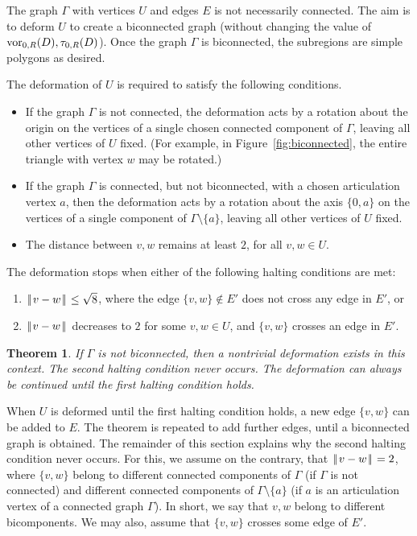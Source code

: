 \documentclass[11pt]{amsart}
\def\op#1{{\text{#1}}}
\def\text{\hbox}
\def\|{{\hskip0.1em|\hskip-0.15em|\hskip0.1em}}
\newtheorem{thm}{Theorem}
\begin{document}
The graph $\Gamma$ with vertices $U$ and edges $E$ is not necessarily connected.  The aim is to deform
$U$ to create a biconnected graph (without changing the value of $\op{vor}_{0,R}(D),\tau_{0,R}(D)$).  Once the graph $\Gamma$
is biconnected, the subregions are simple polygons as desired.

The deformation of $U$ is required to satisfy the following conditions.
\begin{itemize}
\item If the graph $\Gamma$ is not connected,
the deformation acts by a rotation about the origin 
on the vertices of a single chosen connected component of $\Gamma$,
leaving all other vertices of $U$ fixed.  (For example, in Figure~\ref{fig:biconnected}, the entire triangle with vertex $w$ may be rotated.)
\item If the graph $\Gamma$ is connected, but not biconnected, with a chosen articulation vertex $a$, then
the deformation acts by a rotation about the axis $\{0,a\}$ on the vertices of a single component of $\Gamma\setminus\{a\}$,
leaving all other vertices of $U$ fixed.
\item The distance between $v,w$ remains at least $2$, for all $v,w\in U$.
\end{itemize}

The deformation stops when either of the following halting conditions are met:
\begin{enumerate}
\item $\|v-w\|\le\sqrt8$, where the edge $\{v,w\}\not\in E'$ does not cross any edge in $E'$, or
\item $\|v-w\|$ decreases to $2$ for some $v,w\in U$, and $\{v,w\}$ crosses an edge in $E'$.
\end{enumerate}

\begin{thm}\label{thm:biconnected}  
If $\Gamma$ is not biconnected, then a nontrivial deformation exists in this context. 
The second halting condition never occurs.  The deformation can always be continued until the first halting
condition holds.
\end{thm}

When $U$ is deformed until the first halting condition holds, a new edge $\{v,w\}$ can be added to $E$.
The theorem is repeated to add further edges, until a biconnected graph is obtained.  
The remainder of this section explains why the second halting condition never occurs.  For
this, we assume on the contrary, that $\|v-w\|=2$, where $\{v,w\}$ belong to different connected components
of $\Gamma$ (if $\Gamma$ is not connected) and different connected components of $\Gamma\setminus\{a\}$ (if $a$
is an articulation vertex of a connected graph $\Gamma$).  In short, we say that $v,w$ belong to
different bicomponents.  We may also, assume that $\{v,w\}$ crosses some edge of $E'$.
\end{document}
